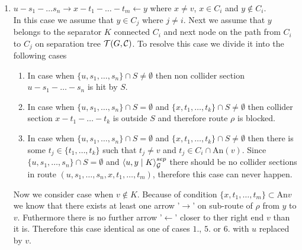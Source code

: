 \begin{prf}
\begin{enumerate}
		\item $u - s_1 - \dots s_n \rightarrow x - t_1 - \dots - t_m \leftarrow y$ where $x \neq v$, $x \in C_i$ and $y \not\in C_i$. \\ 
			In this case we assume that $y \in C_j$ where $j \neq i$. Next we assume that $y$ belongs to the separator $K$ 
			connected  $C_i$ and next node on the path from $C_i$ to $C_j$ on separation tree $\mathcal{T}(G, \mathcal{C})$. To resolve this
			case we divide it into the following cases

			\begin{enumerate}
				\item In case when $\{u, s_1, \dots, s_n \} \cap S \neq \emptyset$ then non collider section $u - s_1 - \dots - s_n$ is hit by $S$.

				\item In case when $\{u, s_1, \dots, s_n \} \cap S = \emptyset$ and $\{x, t_1, \dots, t_k \} \cap S \neq \emptyset$ then 
					collider section $x - t_1 - \dots - t_k$ is outside $S$ and therefore route $\rho$ is blocked.

				\item In case when $\{u, s_1, \dots, s_n \} \cap S = \emptyset$ and $\{x, t_1, \dots, t_k \} \cap S \neq \emptyset$ then
					there is some $t_j \in \{ t_1, \dots, t_k \}$ such that $t_j \neq v$ and $t_j \in C_i \cap \mbox{An}(v)$. 
				 	Since $\{ u, s_1, \dots, s_n \} \cap S = \emptyset$ and $\left\langle u , y \mid K \right\rangle_{\mathcal{G}}^{sep}$ there should be no 
					collider sections in route $(u, s_1, \dots, s_n, x, t_1, \dots, t_m)$, therefore this case can never happen.
			\end{enumerate}

			Now we consider case when $v \not\in K$. Because of condition $\{ x, t_1, \dots, t_m \} \subset \mbox{An}{v}$ we know that
			there exists at least one arrow '$\rightarrow$' on sub-route of $\rho$ from $y$ to $v$. Futhermore there is no further arrow '$\leftarrow$' 
			closer to ther right end $v$ than it is. Therefore this case identical as one of cases $1.$, $5.$ or $6.$ with $u$ replaced by $v$.


\end{enumerate}
\end{prf}

